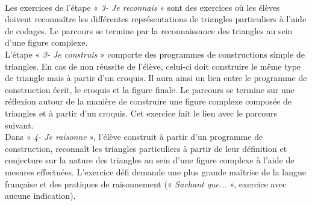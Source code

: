 \paragraph{} Les exercices de l'étape « \textit{3- Je reconnais} » sont des exercices où les élèves doivent reconnaître les différentes représentations de triangles particuliers à l'aide de codages. Le parcours se termine par la reconnaissance des triangles au sein d'une figure complexe.\\
L'étape « \textit{3- Je construis} » comporte des programmes de constructions simple de triangles. En cas de non réussite de l'élève, celui-ci doit construire le même type de triangle mais à partir d'un croquis. Il aura ainsi un lien entre le programme de construction écrit, le croquis et la figure finale. Le parcours se termine sur une réflexion autour de la manière de construire une figure complexe composée de triangles et à partir d'un croquis. Cet exercice fait le lien avec le parcours suivant.\\
Dans « \textit{4- Je raisonne} », l'élève construit à partir d'un programme de construction, reconnaît les triangles particuliers à partir de leur définition et conjecture sur la nature des triangles au sein d'une figure complexe à l'aide de mesures effectuées. L'exercice défi demande une plus grande maîtrise de la langue française et des pratiques de raisonnement (« \textit{Sachant que...} », exercice avec aucune indication).
